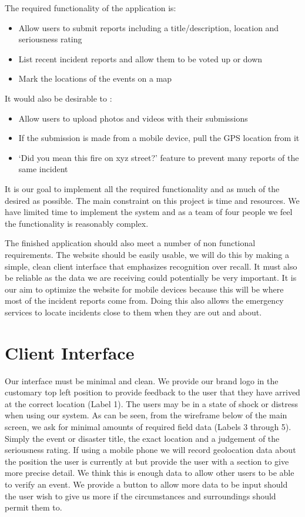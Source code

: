\documentclass{sig-alt-release2}
\begin{document}
The required functionality of the application is:
\begin{itemize}
\item  Allow users to submit reports including a title/description, location and seriousness rating
\item  List recent incident reports and allow them to be voted up or down
\item  Mark the locations of the events on a map
\end{itemize}

It would also be desirable to :

\begin{itemize}
\item  Allow users to upload photos and videos with their submissions
\item  If the submission is made from a mobile device, pull the GPS location from it
\item ‘Did you mean this fire on xyz street?’ feature to prevent many reports of the same incident
\end{itemize}

It is our goal to implement all the required functionality and as much of the desired as possible. The main constraint on this project is time and resources. We have limited time to implement the system and as a team of four people we feel the functionality is reasonably complex.

The finished application should also meet a number of non functional requirements. The website should be easily usable, we will do this by making a simple, clean client interface that emphasizes recognition over recall. It must also be reliable as the data we are receiving could potentially be very important. It is our aim to optimize the website for mobile devices because this will be where most of the incident reports come from. Doing this also allows the emergency services to locate incidents close to them when they are out and about.

\section{Client Interface}
Our interface must be minimal and clean. We provide our brand logo in the customary top left position to provide feedback to the user that they have arrived at the correct location (Label 1). The users may be in a state of shock or distress when using our system. As can be seen, from the wireframe below of the main screen, we ask for minimal amounts of required field data (Labels 3 through 5). Simply the event or disaster title, the exact location and a judgement of the seriousness rating. If using a mobile phone we will record geolocation data about the position the user is currently at but provide the user with a section to give more precise detail. We think this is enough data to allow other users to be able to verify an event. We provide a button to allow more data to be input should the user wish to give us more if the circumstances and surroundings should permit them to.
\end{document}
